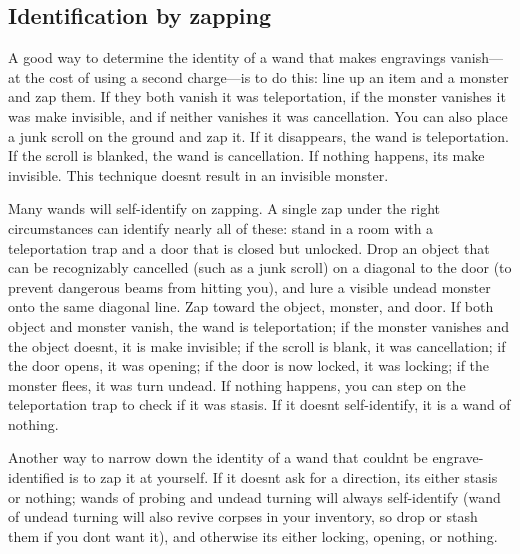 \subsection{Identification by zapping}
\label{13}
A good way to determine the identity of a wand that makes engravings vanish{\mbox{$\text{---}$}}at the cost of using a second charge{\mbox{$\text{---}$}}is to do this: line up an item and a monster and zap them. If they both vanish it was teleportation, if the monster vanishes it was make invisible, and if neither vanishes it was cancellation. You can also place a junk\footnotemark[174] scroll on the ground and zap it. If it disappears, the wand is teleportation. If the scroll is blanked, the wand is cancellation. If nothing happens, it\textquotesingle{}s make invisible. This technique doesn\textquotesingle{}t result in an invisible monster.


Many wands will self-{}identify on zapping. A single zap under the right circumstances can identify nearly all of these: stand in a room with a teleportation trap and a door that is closed but unlocked. Drop an object that can be recognizably cancelled (such as a junk scroll) on a diagonal to the door (to prevent dangerous beams from hitting you), and lure a visible undead monster onto the same diagonal line. Zap toward the object, monster, and door. If both object and monster vanish, the wand is teleportation; if the monster vanishes and the object doesn\textquotesingle{}t, it is make invisible; if the scroll is blank, it was cancellation; if the door opens, it was opening; if the door is now locked, it was locking; if the monster flees, it was turn undead. If nothing happens, you can step on the teleportation trap to check if it was stasis. If it doesn\textquotesingle{}t self-{}identify, it is a wand of nothing.


Another way to narrow down the identity of a wand that couldn\textquotesingle{}t be engrave-{}identified is to zap it at yourself. If it doesn\textquotesingle{}t ask for a direction, it\textquotesingle{}s either stasis or nothing; wands of probing and undead turning will always self-{}identify (wand of undead turning will also revive corpses in your inventory, so drop or stash them if you don\textquotesingle{}t want it), and otherwise it\textquotesingle{}s either locking, opening, or nothing.




